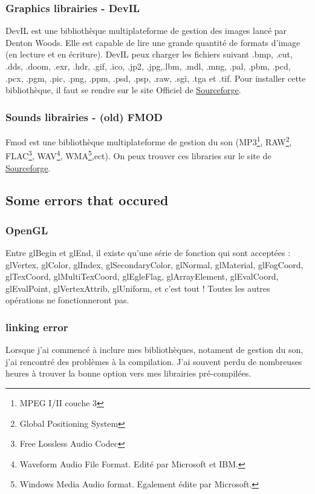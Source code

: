 \documentclass[12pt]{article}
\begin{document}
\subsubsection{Graphics librairies - DevIL}

DevIL est une bibliothèque multiplateforme de gestion des images lancé par Denton Woods. Elle est capable de lire une grande quantité de formats d'image (en lecture et en écriture).
DevIL peux charger les fichiers suivant .bmp, .cut, .dds, .doom, .exr, .hdr, .gif, .ico, .jp2, .jpg,.lbm, .mdl, .mng, .pal, .pbm, .pcd, .pcx, .pgm, .pic, .png, .ppm, .psd, .psp, .raw, .sgi, .tga et .tif. Pour installer cette bibliothèque, il faut se rendre sur le site Officiel de \href{http://openil.sourceforge.net/}{Sourceforge}\cite{DevIL}.

\newpage
\subsubsection{Sounds librairies - (old) FMOD}
Fmod est une bibliothèque multiplateforme de gestion du son (MP3\footnote{MPEG I/II couche 3}, RAW\footnote{Global Positioning System}, FLAC\footnote{Free Lossless Audio Codec}, WAV\footnote{Waveform Audio File Format. Edité par Microsoft et IBM.}, WMA\footnote{Windows Media Audio format. Egalement édite par Microsoft.},ect). On peux trouver ces libraries sur le site de \href{https://github.com/ikreymer/cavewriting}{Sourceforge}\cite{fmodDLL}.\\

\subsection{Some errors that occured}
\subsubsection{OpenGL}
Entre glBegin et glEnd, il existe qu'une série de fonction qui sont acceptées : glVertex, glColor, glIndex, glSecondaryColor, glNormal, glMaterial, glFogCoord, glTexCoord, glMultiTexCoord, glEgleFlag, glArrayElement, glEvalCoord, glEvalPoint, glVertexAttrib, glUniform, et c'est tout ! Toutes les autres opérations ne fonctionneront pas\cite{openclassrooms}.\\

\subsubsection{linking error}
Lorsque j'ai commencé à inclure mes bibliothèques, notament de gestion du son, j'ai rencontré des problèmes à la compilation. J'ai souvent perdu de nombreuses heures à trouver la bonne option vers mes librairies pré-compilées.
\end{document}
